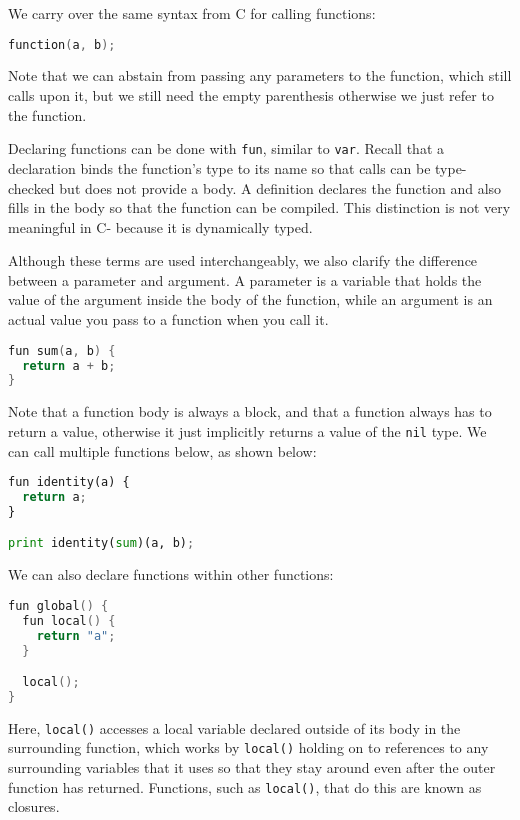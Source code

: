 We carry over the same syntax from C for calling functions: 

\begin{lstlisting}[language=C]
function(a, b);
\end{lstlisting}

Note that we can abstain from passing any parameters to the function, which still calls upon it, but we still need the empty parenthesis otherwise we just refer to the function. 

Declaring functions can be done with \verb+fun+, similar to \verb+var+. Recall that a declaration binds the function’s type to its name so that calls can be type-checked but does not provide a body. A definition declares the function and also fills in the body so that the function can be compiled. This distinction is not very meaningful in C- because it is dynamically typed. 

Although these terms are used interchangeably, we also clarify the difference between a parameter and argument. A parameter is a variable that holds the value of the argument inside the body of the function, while an argument is an actual value you pass to a function when you call it.

\begin{lstlisting}[language=C]
fun sum(a, b) {
  return a + b;
}
\end{lstlisting}

Note that a function body is always a block, and that a function always has to return a value, otherwise it just implicitly returns a value of the \verb+nil+ type. We can call multiple functions below, as shown below:

\begin{lstlisting}[language=python]
fun identity(a) {
  return a;
}

print identity(sum)(a, b);
\end{lstlisting}

We can also declare functions within other functions:


\begin{lstlisting}[language=C]
fun global() {
  fun local() {
    return "a";
  }

  local();
}
\end{lstlisting}

Here, \verb+local()+ accesses a local variable declared outside of its body in the surrounding function, which works by \verb+local()+ holding on to references to any surrounding variables that it uses so that they stay around even after the outer function has returned. Functions, such as \verb+local()+, that do this are known as closures.

